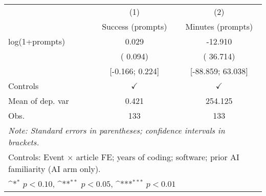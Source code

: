 \def\sym#1{\ifmmode^{#1}\else\(^{#1}\)\fi}
\begin{tabular}{l*{2}{c}}
\hline\hline
 & (1) & (2)
\\
 & Success (prompts) & Minutes (prompts)
 \\
\hline
log(1+prompts) &  0.029 & -12.910
\\
 & ( 0.094) & ( 36.714)
\\
 & [-0.166;  0.224] & [-88.859;  63.038]
\\
\hline
Controls & $\checkmark$ & $\checkmark$
\\
Mean of dep. var &  0.421 &  254.125
\\
Obs. & 133 & 133
\\
\hline
\hline\hline
\multicolumn{3}{l}{\it{Note:} Standard errors in parentheses; confidence intervals in brackets.}\\
\multicolumn{3}{l}{Controls: Event $\times$ article FE; years of coding; software; prior AI familiarity (AI arm only).}\\
\multicolumn{3}{l}{\sym{*} $p<0.10$, \sym{**} $p<0.05$,  \sym{***} $p<0.01$}\\
\end{tabular}

